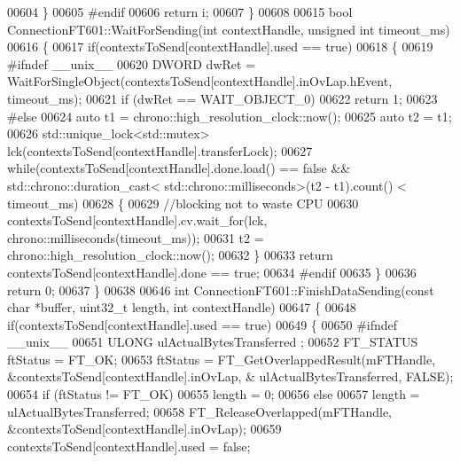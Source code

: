 \begin{DoxyCode}
{{{{{00604     \}
00605 \textcolor{preprocessor}{#endif}
00606     \textcolor{keywordflow}{return} i;
00607 \}
00608 
00615 \textcolor{keywordtype}{bool} ConnectionFT601::WaitForSending(\textcolor{keywordtype}{int} contextHandle, \textcolor{keywordtype}{unsigned} \textcolor{keywordtype}{int} timeout_ms)
00616 \{
00617     \textcolor{keywordflow}{if}(contextsToSend[contextHandle].used == \textcolor{keyword}{true})
00618     \{
00619 \textcolor{preprocessor}{#ifndef \_\_unix\_\_}
00620         DWORD dwRet = WaitForSingleObject(contextsToSend[contextHandle].inOvLap.hEvent, timeout\_ms);
00621             \textcolor{keywordflow}{if} (dwRet == WAIT\_OBJECT\_0)
00622                 \textcolor{keywordflow}{return} 1;
00623 \textcolor{preprocessor}{#else}
00624         \textcolor{keyword}{auto} t1 = chrono::high\_resolution\_clock::now();
00625         \textcolor{keyword}{auto} t2 = t1;
00626         std::unique\_lock<std::mutex> lck(contextsToSend[contextHandle].transferLock);
00627         \textcolor{keywordflow}{while}(contextsToSend[contextHandle].done.load() == \textcolor{keyword}{false} && std::chrono::duration\_cast<
      std::chrono::milliseconds>(t2 - t1).count() < timeout_ms)
00628         \{
00629             \textcolor{comment}{//blocking not to waste CPU}
00630             contextsToSend[contextHandle].cv.wait\_for(lck, chrono::milliseconds(timeout\_ms));
00631             t2 = chrono::high\_resolution\_clock::now();
00632         \}
00633         \textcolor{keywordflow}{return} contextsToSend[contextHandle].done == \textcolor{keyword}{true};
00634 \textcolor{preprocessor}{#endif}
00635     \}
00636     \textcolor{keywordflow}{return} 0;
00637 \}
00638 
00646 \textcolor{keywordtype}{int} ConnectionFT601::FinishDataSending(\textcolor{keyword}{const} \textcolor{keywordtype}{char} *buffer, uint32\_t length, \textcolor{keywordtype}{int} contextHandle)
00647 \{
00648     \textcolor{keywordflow}{if}(contextsToSend[contextHandle].used == \textcolor{keyword}{true})
00649     \{
00650 \textcolor{preprocessor}{#ifndef \_\_unix\_\_}
00651         ULONG ulActualBytesTransferred ;
00652         FT_STATUS ftStatus = FT_OK;
00653         ftStatus = FT\_GetOverlappedResult(mFTHandle, &contextsToSend[contextHandle].inOvLap, &
      ulActualBytesTransferred, FALSE);
00654         \textcolor{keywordflow}{if} (ftStatus != FT_OK)
00655             length = 0;
00656         \textcolor{keywordflow}{else}
00657         length = ulActualBytesTransferred;
00658         FT\_ReleaseOverlapped(mFTHandle, &contextsToSend[contextHandle].inOvLap);
00659         contextsToSend[contextHandle].used = \textcolor{keyword}{false};
}}}}}
\end{DoxyCode}
